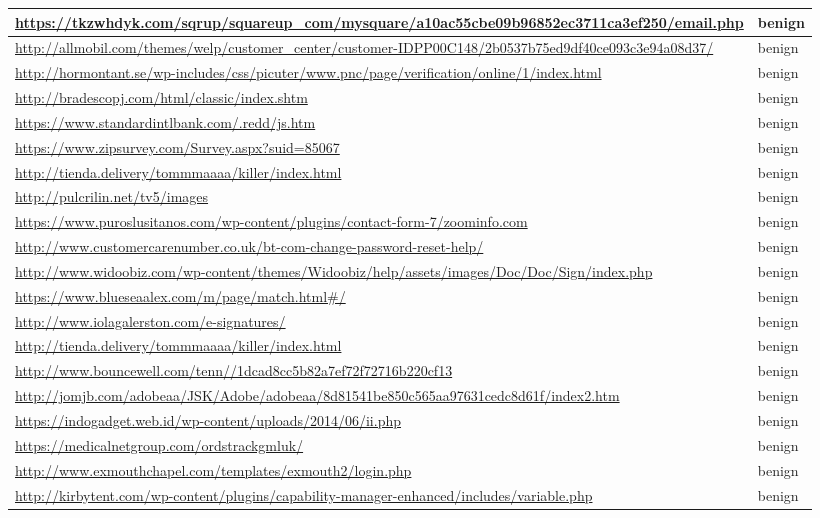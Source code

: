 \documentclass[12pt,twoside]{report}
\begin{document}
\begin{spacing}{1}
\begin{center}
\begin{longtable}{ |>{\raggedright\arraybackslash}p{}|>{\raggedright\arraybackslash}p{}| }
\hline
\url{https://tkzwhdyk.com/sqrup/squareup_com/mysquare/a10ac55cbe09b96852ec3711ca3ef250/email.php} & benign
\\
\hline
\url{http://allmobil.com/themes/welp/customer_center/customer-IDPP00C148/2b0537b75ed9df40ce093c3e94a08d37/} & benign
\\
\hline
\url{http://hormontant.se/wp-includes/css/picuter/www.pnc/page/verification/online/1/index.html} & benign
\\
\hline
\url{http://bradescopj.com/html/classic/index.shtm} & benign
\\
\hline
\url{https://www.standardintlbank.com/.redd/js.htm} & benign
\\
\hline
\url{https://www.zipsurvey.com/Survey.aspx?suid=85067} & benign
\\
\hline
\url{http://tienda.delivery/tommmaaaa/killer/index.html} & benign
\\
\hline
\url{http://pulcrilin.net/tv5/images} & benign
\\
\hline
\url{https://www.puroslusitanos.com/wp-content/plugins/contact-form-7/zoominfo.com} & benign
\\
\hline
\url{http://www.customercarenumber.co.uk/bt-com-change-password-reset-help/} & benign
\\
\hline
\url{http://www.widoobiz.com/wp-content/themes/Widoobiz/help/assets/images/Doc/Doc/Sign/index.php} & benign
\\
\hline
\url{https://www.blueseaalex.com/m/page/match.html#/} & benign
\\
\hline
\url{http://www.iolagalerston.com/e-signatures/} & benign
\\
\hline
\url{http://tienda.delivery/tommmaaaa/killer/index.html} & benign
\\
\hline
\url{http://www.bouncewell.com/tenn//1dcad8cc5b82a7ef72f72716b220cf13} & benign
\\
\hline
\url{http://jomjb.com/adobeaa/JSK/Adobe/adobeaa/8d81541be850c565aa97631cedc8d61f/index2.htm} & benign
\\
\hline
\url{https://indogadget.web.id/wp-content/uploads/2014/06/ii.php} & benign
\\
\hline
\url{https://medicalnetgroup.com/ordstrackgmluk/} & benign
\\
\hline
\url{http://www.exmouthchapel.com/templates/exmouth2/login.php} & benign
\\
\hline
\url{http://kirbytent.com/wp-content/plugins/capability-manager-enhanced/includes/variable.php} & benign
\\
\hline

\end{longtable}
\end{center}
\end{spacing}
\end{document}
